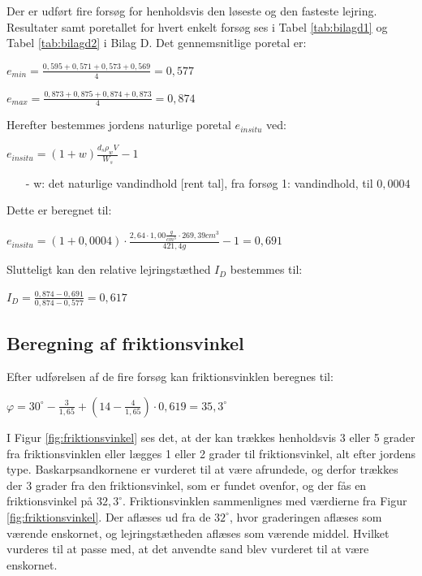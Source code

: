 Der er udført fire forsøg for henholdsvis den løseste og den fasteste lejring. Resultater samt poretallet for hvert enkelt forsøg ses i Tabel \ref{tab:bilagd1} og Tabel \ref{tab:bilagd2} i Bilag D.
Det gennemsnitlige poretal er:

\begin{center}
	$e_{min} = \frac{0,\!595 + 0,\!571 + 0,\!573 + 0,\!569}{4} = 0,\!577$
\end{center}

\begin{center}
	$e_{max} = \frac{0,\!873 + 0,\!875 + 0,\!874 + 0,\!873}{4} = 0,\!874$
\end{center}

Herefter bestemmes jordens naturlige poretal $e_{in situ}$ ved:

\begin{center}
	$e_{in situ} = (1 + w) \frac{d_s  \rho_w  V}{W_s} - 1$
\end{center}

\begin{itemize}
	\item[-] w: det naturlige vandindhold [rent tal], fra forsøg 1: vandindhold, til $0,\!0004$ 
\end{itemize}

Dette er beregnet til:

\begin{center}
	$e_{in situ} = (1+0,\!0004) \cdot \frac{2,\!64 \cdot 1,\!00 \frac{g}{cm^3} \cdot 269,\!39 cm^3}{421,\!4 g} - 1 = 0,\!691$
\end{center}

Slutteligt kan den relative lejringstæthed $I_D$ bestemmes til:

\begin{center}
	$I_D = \frac{0,\!874 - 0,\!691}{0,\!874 - 0,\!577} = 0,\!617$
\end{center}

\subsection{Beregning af friktionsvinkel}
Efter udførelsen af de fire forsøg kan friktionsvinklen beregnes til:

\begin{center}
	$\varphi = 30^\circ - \frac{3}{1,\!65} + (14 - \frac{4}{1,\!65}) \cdot 0,\!619 = 35,\!3^\circ$
\end{center}

I Figur \ref{fig:friktionsvinkel} ses det, at der kan trækkes henholdsvis 3 eller 5 grader fra friktionsvinklen eller lægges 1 eller 2 grader til friktionsvinkel, alt efter jordens type. Baskarpsandkornene er vurderet til at være afrundede, og derfor trækkes der 3 grader fra den friktionsvinkel, som er fundet ovenfor, og der fås en friktionsvinkel på $32,\!3^\circ$. 
\newline
\newline
Friktionsvinklen sammenlignes med værdierne fra Figur \ref{fig:friktionsvinkel}. Der aflæses ud fra de $32^{\circ}$, hvor graderingen aflæses som værende enskornet, og lejringstætheden aflæses som værende middel. Hvilket vurderes til at passe med, at det anvendte sand blev vurderet til at være enskornet.


